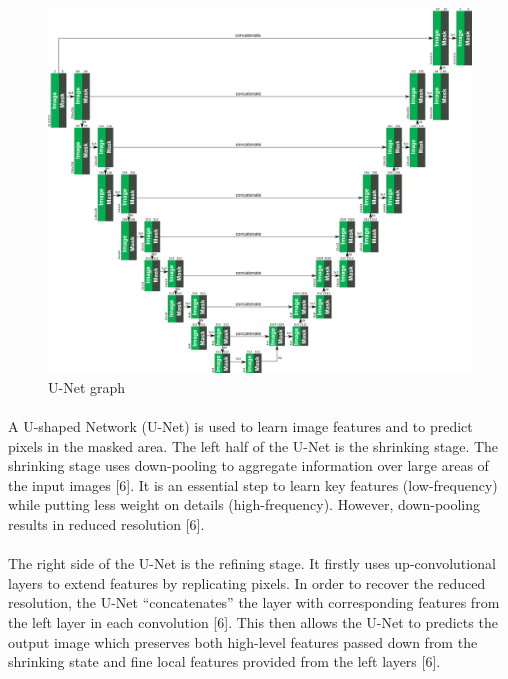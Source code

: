 \documentclass{article}
\begin{document}
\begin{figure}[ht]
  \centering
  \includegraphics[scale=0.6]{graph.png}
  \caption{U-Net graph}
\end{figure}

\paragraph{}
A U-shaped Network (U-Net) is used to learn image features and to predict pixels in the masked area. The left half of the U-Net is the shrinking stage. The shrinking stage uses down-pooling to aggregate information over large areas of the input images [6]. It is an essential step to learn key features (low-frequency) while putting less weight on details (high-frequency). However, down-pooling results in reduced resolution [6].

\paragraph{}
The right side of the U-Net is the refining stage. It firstly uses up-convolutional layers to extend features by replicating pixels. In order to recover the reduced resolution,  the U-Net “concatenates” the layer with corresponding features from the left layer in each convolution [6]. This then allows the U-Net to predicts the output image which preserves both high-level features passed down from the shrinking state and fine local features provided from the left layers [6]. 
\end{document}
